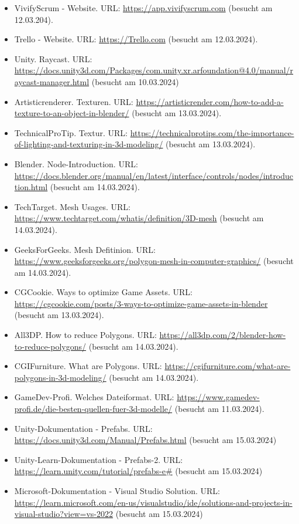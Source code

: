 \begin{itemize}
    \item VivifyScrum - Website. URL: \url{https://app.vivifyscrum.com} (besucht am 12.03.204).
    \item Trello - Website. URL: \url{https://Trello.com} (besucht am 12.03.2024).
    \item Unity. Raycast. URL: \url{https://docs.unity3d.com/Packages/com.unity.xr.arfoundation@4.0/manual/raycast-manager.html} (besucht am 10.03.2024)
    \item Artisticrenderer. Texturen. URL: \url{https://artisticrender.com/how-to-add-a-texture-to-an-object-in-blender/} (besucht am 13.03.2024).
    \item TechnicalProTip. Textur. URL: \url{https://technicalprotips.com/the-importance-of-lighting-and-texturing-in-3d-modeling/} (besucht am 13.03.2024).
    \item Blender. Node-Introduction. URL: \url{https://docs.blender.org/manual/en/latest/interface/controls/nodes/introduction.html} (besucht am 14.03.2024).
    \item TechTarget. Mesh Usages. URL: \url{https://www.techtarget.com/whatis/definition/3D-mesh} (besucht am 14.03.2024).
    \item GeeksForGeeks. Mesh Defitinion. URL: \url{https://www.geeksforgeeks.org/polygon-mesh-in-computer-graphics/} (besucht am 14.03.2024).
    \item CGCookie. Ways to optimize Game Assets. URL: \url{https://cgcookie.com/posts/3-ways-to-optimize-game-assets-in-blender} (besucht am 13.03.2024).
    \item All3DP. How to reduce Polygons. URL: \url{https://all3dp.com/2/blender-how-to-reduce-polygons/} (besucht am 14.03.2024).
    \item CGIFurniture. What are Polygons. URL: \url{https://cgifurniture.com/what-are-polygons-in-3d-modeling/} (besucht am 14.03.2024).
    \item GameDev-Profi. Welches Dateiformat. URL: \url{https://www.gamedev-profi.de/die-besten-quellen-fuer-3d-modelle/} (besucht am 11.03.2024).
    \item Unity-Dokumentation - Prefabs. URL: \url{https://docs.unity3d.com/Manual/Prefabs.html} (besucht am 15.03.2024)
    \item Unity-Learn-Dokumentation - Prefabs-2. URL: \url{https://learn.unity.com/tutorial/prefabs-e#} (besucht am 15.03.2024)
    \item Microsoft-Dokumentation - Visual Studio Solution. URL: \url{https://learn.microsoft.com/en-us/visualstudio/ide/solutions-and-projects-in-visual-studio?view=vs-2022} (besucht am 15.03.2024)

\end{itemize}

